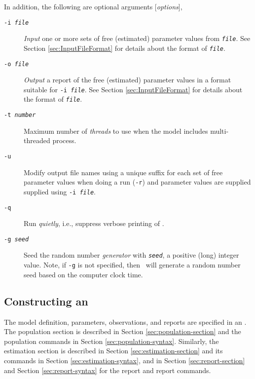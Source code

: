 In addition, the following are optional arguments [\emph{options}],

\begin{description}
\item [\texttt{-i \emph{file}}] \emph{Input} one or more sets of free (estimated) parameter values from \texttt{\emph{file}}. See Section \ref{sec:InputFileFormat} for details about the format of \texttt{\emph{file}}.

\item [\texttt{-o \emph{file}}] \emph{Output} a report of the free (estimated) parameter values in a format suitable for \texttt{-i \emph{file}}. See Section \ref{sec:InputFileFormat} for details about the format of \texttt{\emph{file}}.

\item [\texttt{-t \emph{number}}] Maximum number of \emph{threads} to use when the model includes multi-threaded process.

\item [\texttt{-u}] Modify output file names using a unique suffix for each set of free parameter values when doing a run (\texttt{-r}) and parameter values are supplied supplied using \texttt{-i \emph{file}}.

\item [\texttt{-q}] Run \emph{quietly}, i.e., suppress verbose printing of \SPM.

\item [\texttt{-g \emph{seed}}]  Seed the random number \emph{generator} with \texttt{\emph{seed}}, a positive (long) integer value. Note, if \texttt{-g} is not specified, then \SPM\ will  generate a random number seed based on the computer clock time.
\end{description}

\subsection{Constructing an \SPM\ \config \label{constructing-spm-config}}

The model definition, parameters, observations, and reports are specified in an \config. The  population section is described in Section \ref{sec:population-section} and the population commands in Section \ref{sec:population-syntax}. Similarly, the estimation section is described in Section \ref{sec:estimation-section} and its commands in Section \ref{sec:estimation-syntax}, and in Section \ref{sec:report-section} and Section \ref{sec:report-syntax} for the report and report commands. 

